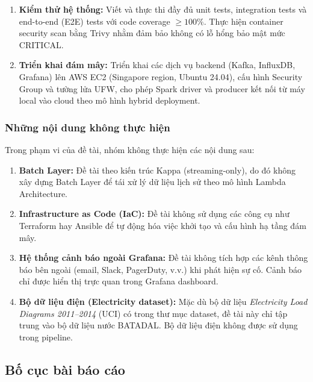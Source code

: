 \begin{enumerate}[label=\arabic*.]
  \item \textbf{Kiểm thử hệ thống:} Viết và thực thi đầy đủ unit tests, integration
    tests và end-to-end (E2E) tests với code coverage $\geq 100\%$. Thực hiện container
    security scan bằng Trivy nhằm đảm bảo không có lỗ hổng bảo mật mức CRITICAL.

  \item \textbf{Triển khai đám mây:} Triển khai các dịch vụ backend (Kafka, InfluxDB,
    Grafana) lên AWS EC2 (Singapore region, Ubuntu 24.04), cấu hình Security Group và
    tường lửa UFW, cho phép Spark driver và producer kết nối từ máy local vào cloud
    theo mô hình hybrid deployment.
\end{enumerate}

\subsubsection{Những nội dung không thực hiện}

Trong phạm vi của đề tài, nhóm không thực hiện các nội dung sau:

\begin{enumerate}[label=\arabic*.]
  \item \textbf{Batch Layer:} Đề tài theo kiến trúc Kappa (streaming-only), do đó
    không xây dựng Batch Layer để tái xử lý dữ liệu lịch sử theo mô hình Lambda
    Architecture.

  \item \textbf{Infrastructure as Code (IaC):} Đề tài không sử dụng các công cụ
    như Terraform hay Ansible để tự động hóa việc khởi tạo và cấu hình hạ tầng
    đám mây.

  \item \textbf{Hệ thống cảnh báo ngoài Grafana:} Đề tài không tích hợp các kênh
    thông báo bên ngoài (email, Slack, PagerDuty, v.v.) khi phát hiện sự cố. Cảnh
    báo chỉ được hiển thị trực quan trong Grafana dashboard.

  \item \textbf{Bộ dữ liệu điện (Electricity dataset):} Mặc dù bộ dữ liệu
    \textit{Electricity Load Diagrams 2011--2014} (UCI) có trong thư mục dataset,
    đề tài này chỉ tập trung vào bộ dữ liệu nước BATADAL. Bộ dữ liệu điện không
    được sử dụng trong pipeline.
\end{enumerate}

\subsection{Bố cục bài báo cáo}

